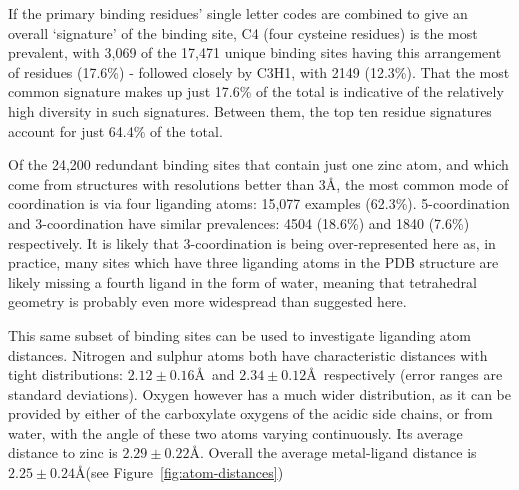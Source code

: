 If the primary binding residues' single letter codes are combined to give an overall `signature' of the binding site, C4 (four cysteine residues) is the most prevalent, with 3,069 of the 17,471 unique binding sites having this arrangement of residues (17.6\%) - followed closely by C3H1, with 2149 (12.3\%). That the most common signature makes up just 17.6\% of the total is indicative of the relatively high diversity in such signatures. Between them, the top ten residue signatures account for just 64.4\% of the total.

Of the 24,200 redundant binding sites that contain just one zinc atom, and which come from structures with resolutions better than 3\AA, the most common mode of coordination is via four liganding atoms: 15,077 examples (62.3\%). 5-coordination and 3-coordination have similar prevalences: 4504 (18.6\%) and 1840 (7.6\%) respectively. It is likely that 3-coordination is being over-represented here as, in practice, many sites which have three liganding atoms in the PDB structure are likely missing a fourth ligand in the form of water, meaning that tetrahedral geometry is probably even more widespread than suggested here.

This same subset of binding sites can be used to investigate liganding atom distances. Nitrogen and sulphur atoms both have characteristic distances with tight distributions: $2.12\pm0.16$\AA\ and $2.34\pm0.12$\AA\ respectively (error ranges are standard deviations). Oxygen however has a much wider distribution, as it can be provided by either of the carboxylate oxygens of the acidic side chains, or from water, with the angle of these two atoms varying continuously. Its average distance to zinc is $2.29\pm0.22$\AA. Overall the average metal-ligand distance is $2.25\pm0.24$\AA  (see Figure~\ref{fig:atom-distances})

